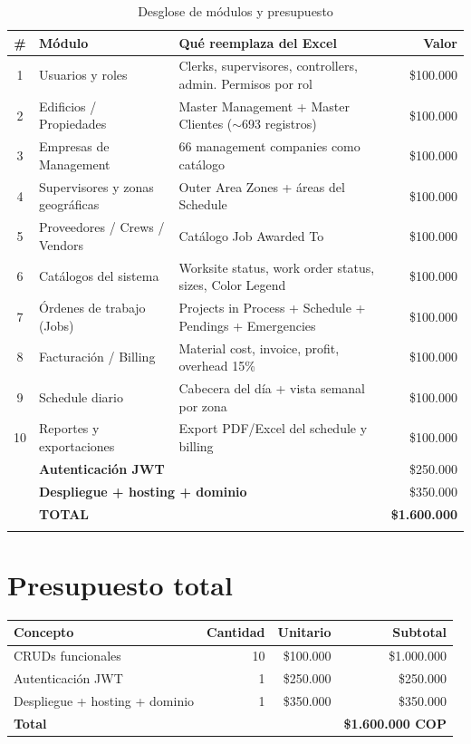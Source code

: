 \documentclass[11pt,a4paper]{article}
\newcommand{\money}[1]{\$#1}
\begin{document}
\begin{longtable}{@{}clp{5.8cm}r@{}}
\toprule
\textbf{\#} & \textbf{M\'odulo} & \textbf{Qu\'e reemplaza del Excel} & \textbf{Valor} \\
\midrule
\endhead
1 & Usuarios y roles & Clerks, supervisores, controllers, admin. Permisos por rol & \money{100.000} \\
2 & Edificios / Propiedades & Master Management + Master Clientes ($\sim$693 registros) & \money{100.000} \\
3 & Empresas de Management & 66 management companies como cat\'alogo & \money{100.000} \\
4 & Supervisores y zonas geogr\'aficas & Outer Area Zones + \'areas del Schedule & \money{100.000} \\
5 & Proveedores / Crews / Vendors & Cat\'alogo Job Awarded To & \money{100.000} \\
6 & Cat\'alogos del sistema & Worksite status, work order status, sizes, Color Legend & \money{100.000} \\
7 & \'Ordenes de trabajo (Jobs) & Projects in Process + Schedule + Pendings + Emergencies & \money{100.000} \\
8 & Facturaci\'on / Billing & Material cost, invoice, profit, overhead 15\% & \money{100.000} \\
9 & Schedule diario & Cabecera del d\'ia + vista semanal por zona & \money{100.000} \\
10 & Reportes y exportaciones & Export PDF/Excel del schedule y billing & \money{100.000} \\
\midrule
& \multicolumn{2}{l}{\textbf{Autenticaci\'on JWT}} & \money{250.000} \\
& \multicolumn{2}{l}{\textbf{Despliegue + hosting + dominio}} & \money{350.000} \\
\midrule
& \multicolumn{2}{l}{\textbf{TOTAL}} & \textbf{\money{1.600.000}} \\
\bottomrule
\caption{Desglose de m\'odulos y presupuesto}
\end{longtable}

\section{Presupuesto total}

\begin{table}[h]
\centering
{}
\begin{tabular}{@{}lrrr@{}}
\toprule
\textbf{Concepto} & \textbf{Cantidad} & \textbf{Unitario} & \textbf{Subtotal} \\
\midrule
CRUDs funcionales & 10 & \money{100.000} & \money{1.000.000} \\
Autenticaci\'on JWT & 1 & \money{250.000} & \money{250.000} \\
Despliegue + hosting + dominio & 1 & \money{350.000} & \money{350.000} \\
\midrule
\textbf{Total} & & & \textbf{\money{1.600.000} COP} \\
\bottomrule
\end{tabular}
\end{table}
\end{document}
